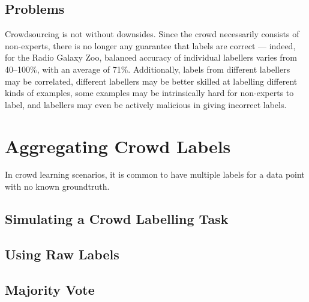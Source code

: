 
    \subsection{Problems}
    \label{sec:crowdsourcing-problems}

        Crowdsourcing is not without downsides. Since the crowd necessarily
        consists of non-experts, there is no longer any guarantee that labels
        are correct --- indeed, for the Radio Galaxy Zoo, balanced accuracy of
        individual labellers varies from 40--100\%, with an average of 71\%.
        Additionally, labels from different labellers may be correlated,
        different labellers may be better skilled at labelling different kinds
        of examples, some examples may be intrinsically hard for non-experts to
        label, and labellers may even be actively malicious in giving incorrect
        labels.


\section{Aggregating Crowd Labels}
\label{sec:crowd-labels}



    In crowd learning scenarios, it is common to have multiple labels for a data
    point with no known groundtruth.


    \subsection{Simulating a Crowd Labelling Task}


    \subsection{Using Raw Labels}
    \label{sec:raw-labels}


    \subsection{Majority Vote}
    \label{sec:majority-vote}

